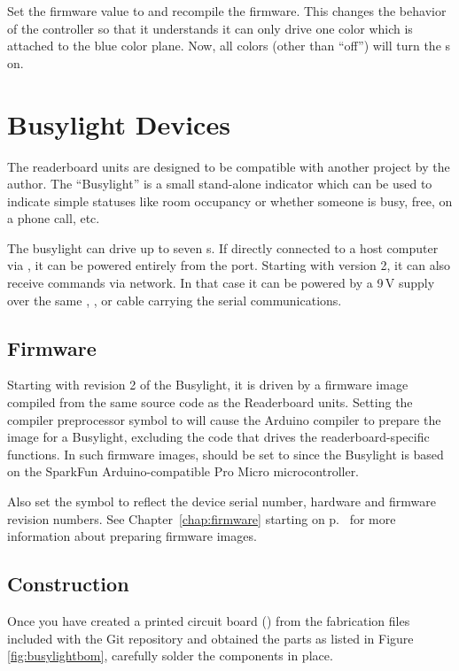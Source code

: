 Set the firmware value  to  and recompile the firmware. This
changes the behavior of the controller so that it understands it can only drive one color which
is attached to the blue color plane. Now, all colors (other than ``off'') will turn the \led s
on.

\section{Busylight Devices}
The readerboard units are designed to be compatible with another project by the author. The ``Busylight''
is a small stand-alone indicator which can be used to indicate simple statuses like room occupancy or
whether someone is busy, free, on a phone call, etc.

The busylight can drive up to seven \led s. If directly connected to a host computer
via , it can be powered entirely from the  port. Starting with version 2,
it can also receive commands via  network. In that case it can be powered by a 9\,V
supply over the same , , or  cable carrying the serial
communications.

\subsection{Firmware}
Starting with revision 2 of the Busylight, it is driven by a firmware image compiled from the same
source code as the Readerboard units. Setting the compiler preprocessor symbol
 to  will cause the Arduino compiler to prepare the image
for a Busylight, excluding the code that drives the readerboard-specific functions.
In such firmware images,  should be set to  since the Busylight is
based on the SparkFun Arduino-compatible Pro Micro microcontroller.

Also set the  symbol to reflect the device serial number, hardware and firmware
revision numbers. See Chapter~\ref{chap:firmware} starting on p.~\pageref{chap:firmware} for more information
about preparing firmware images.

\subsection{Construction}
Once you have created a printed circuit board () from the fabrication
files included with the Git repository and obtained the parts
as listed in Figure \ref{fig:busylightbom}, carefully solder the components in place.

